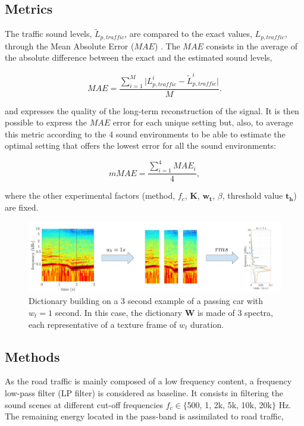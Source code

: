 \documentclass[review,5p,twocolumn,sort&compress,times]{elsarticle}
\begin{document}
\subsection{Metrics}

The traffic sound levels, $\tilde{L}_{p,traffic}$, are compared to the exact values, $L_{p,traffic}$, through the Mean Absolute Error ($MAE$) \cite{willmott2005advantages}. The $MAE$ consists in the average of the absolute difference between the exact and the estimated sound levels,

\begin{equation}
MAE = \frac{\sum_{i = 1}^{M} \vert L_{p,traffic}^i - \tilde{L}_{p,traffic}^i \vert}{M}.
\end{equation}

and expresses the quality of the long-term reconstruction of the signal. It is then possible to express the $MAE$ error for each unique setting but, also, to average this metric according to the 4 sound environments to be able to estimate the optimal setting that offers the lowest error for all the sound environments:

\begin{equation}
mMAE = \frac{\sum_{i = 1}^4 MAE_i}{4},
\end{equation}

where the other experimental factors (method, $f_c$, $\mathbf{K}$, $\mathbf{w_t}$, $\beta$, threshold value $\mathbf{t_h}$) are fixed.


\begin{figure}[t]
\centering
\includegraphics[width=0.8\linewidth]{figures/extractionDictionary2.pdf}
\caption{Dictionary building on a 3 second example of a passing car with $w_t = 1$ second. In this case, the dictionary $\mathbf{W}$ is made of 3 spectra, each representative of a texture frame of $w_t$ duration.}
\label{fig:example_dictionary}
\end{figure}

\subsection{Methods}

As the road traffic is mainly composed of a low frequency content, a frequency low-pass filter (LP filter) is considered as baseline. It consists in filtering the sound scenes at different cut-off frequencies $f_c \in \lbrace$500, 1, 2k, 5k, 10k, 20k$\rbrace$ Hz. The remaining energy located in the pass-band is assimilated to road traffic,
\end{document}
